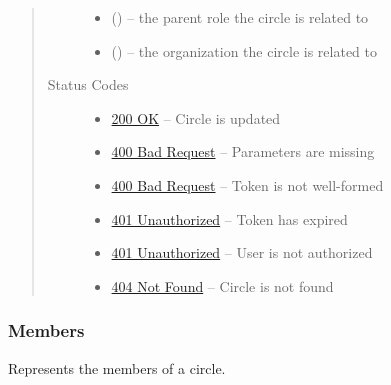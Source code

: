 \documentclass[letterpaper,10pt,english]{sphinxmanual}
\begin{document}
\begin{fulllineitems}
\begin{quote}
\begin{description}
\begin{itemize}
\item {} 
 () -- the parent role the circle is related to

\item {} 
 () -- the organization the circle is related to

\end{itemize}

\item[{Status Codes}] \leavevmode\begin{itemize}
\item {} 
\href{http://www.w3.org/Protocols/rfc2616/rfc2616-sec10.html\#sec10.2.1}{200 OK} -- Circle is updated

\item {} 
\href{http://www.w3.org/Protocols/rfc2616/rfc2616-sec10.html\#sec10.4.1}{400 Bad Request} -- Parameters are missing

\item {} 
\href{http://www.w3.org/Protocols/rfc2616/rfc2616-sec10.html\#sec10.4.1}{400 Bad Request} -- Token is not well-formed

\item {} 
\href{http://www.w3.org/Protocols/rfc2616/rfc2616-sec10.html\#sec10.4.2}{401 Unauthorized} -- Token has expired

\item {} 
\href{http://www.w3.org/Protocols/rfc2616/rfc2616-sec10.html\#sec10.4.2}{401 Unauthorized} -- User is not authorized

\item {} 
\href{http://www.w3.org/Protocols/rfc2616/rfc2616-sec10.html\#sec10.4.5}{404 Not Found} -- Circle is not found

\end{itemize}

\end{description}\end{quote}

\end{fulllineitems}



\subsubsection{Members}
\label{\detokenize{resources/circle:members}}
Represents the members of a circle.
\end{document}

